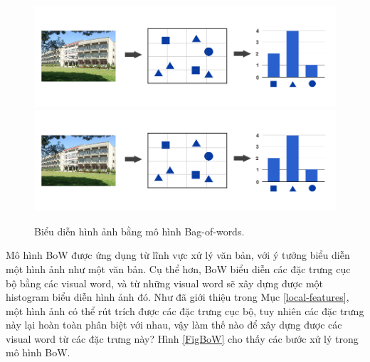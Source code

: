 \begin{figure}[!htbp]
  \begin{center}
    \leavevmode
    \ifpdf
      \includegraphics[scale=0.32]{bow-preview}
    \else
      \includegraphics[scale=0.32]{bow-preview}
    \fi
    \caption[Biểu diễn hình ảnh bằng mô hình Bag-of-words]{Biểu diễn hình ảnh bằng mô hình Bag-of-words.}
    \label{FigBoWPreview}
  \end{center}
\end{figure}

Mô hình BoW được ứng dụng từ lĩnh vực xử lý văn bản, với ý tưởng biểu diễn một hình ảnh như một văn bản. Cụ thể hơn, BoW biểu diễn các đặc trưng cục bộ bằng các visual word, và từ những visual word sẽ xây dựng được một histogram biểu diễn hình ảnh đó. Như đã giới thiệu trong Mục \ref{local-features}, một hình ảnh có thể rút trích được các đặc trưng cục bộ, tuy nhiên các đặc trưng này lại hoàn toàn phân biệt với nhau, vậy làm thế nào để xây dựng được các visual word từ các đặc trưng này? Hình \ref{FigBoW} cho thấy các bước xử lý trong mô hình BoW.

